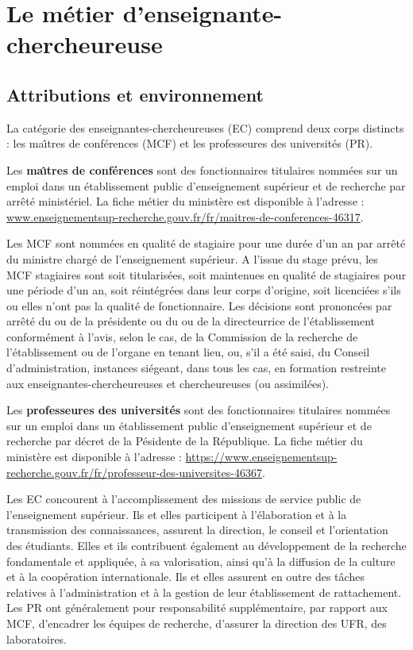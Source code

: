 \chapter{Le m\'etier d'enseignant\mp e-chercheur\mp euse}


\section{Attributions et environnement}
La cat\'egorie des enseignant\mp e\mp s-chercheur\mp euse\mp s (EC) comprend deux corps distincts :
les ma\^\i tres de conf\'erences (MCF) et les professeur\mp e\mp s des universit\'es (PR).

Les \textbf{ma\^\i  tres de conf\'erences} sont des fonctionnaires titulaires
nomm\'e\mp e\mp s sur un emploi dans un \'etablissement public d'enseignement
sup\'erieur et de recherche par arr\^et\'e minist\'eriel. La fiche m\'etier du minist\`ere est disponible \`a l'adresse :
\url{www.enseignementsup-recherche.gouv.fr/fr/maitres-de-conferences-46317}.

Les MCF sont nomm\'e\mp e\mp s en qualit\'e de stagiaire pour une dur\'ee d'un an par arr\^ et\'e du ministre charg\'e de l'enseignement sup\'erieur.
A l'issue du stage pr\'evu, les MCF stagiaires sont soit titularis\'e\mp e\mp s, soit maintenu\mp e\mp s en qualit\'e de stagiaires pour une p\'eriode d'un an, soit r\'eint\'egr\'e\mp e\mp s dans leur corps d'origine, soit licenci\'e\mp e\mp s s'ils ou elles n'ont pas la qualit\'e de fonctionnaire. Les d\'ecisions sont prononc\'ees par arr\^ et\'e du ou de la pr\'esident\mp e ou du ou de la directeur\mp rice de l'\'etablissement conform\'ement \`a l'avis, selon le cas, de la Commission de la recherche de l'\'etablissement ou de l'organe en tenant lieu, ou, s'il a \'et\'e saisi, du Conseil d'administration, instances si\'egeant, dans tous les cas, en formation restreinte aux enseignant\mp e\mp s-chercheur\mp euse\mp s et chercheur\mp euse\mp s (ou assimil\'e\mp e\mp s).

Les \textbf{professeur\mp e\mp s des universit\'es} sont des fonctionnaires titulaires nomm\'e\mp e\mp s sur un emploi dans un \'etablissement public d'enseignement
sup\'erieur et de recherche par d\'ecret de la P\'esident\mp e de la R\'epublique. La fiche m\'etier du minist\`ere est disponible \`a l'adresse : \url{https://www.enseignementsup-recherche.gouv.fr/fr/professeur-des-universites-46367}.

 
Les EC concourent \`a l'accomplissement des missions de service
public de l'enseignement sup\'erieur. Ils et elles participent \`a
l'\'elaboration et \`a la transmission des connaissances, assurent
la direction, le conseil et l'orientation des \'etudiants. Elles et ils
contribuent \'egalement au d\'eveloppement de la recherche
fondamentale et appliqu\'ee, \`a sa valorisation, ainsi qu'\`a la
diffusion de la culture et \`a la coop\'eration internationale. Ils et elles
assurent en outre des t\^aches relatives \`a l'administration et \`a
la gestion de leur \'etablissement de rattachement. Les PR ont g\'en\'eralement pour responsabilit\'e suppl\'ementaire, par
rapport aux MCF, d'encadrer les \'equipes de
recherche, d'assurer la direction des UFR, des laboratoires.


